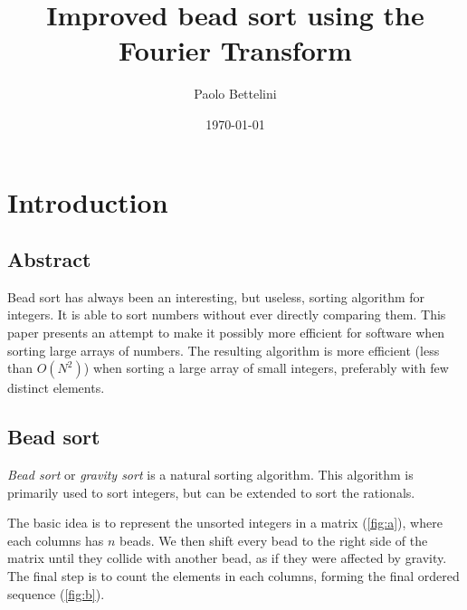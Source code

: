 \documentclass{article}
\title{Improved bead sort using the Fourier Transform}
\author{Paolo Bettelini}
\date{\today}
\begin{document}
\thispagestyle{plain}

\maketitle

\section{Introduction}

\subsection{Abstract}

Bead sort has always been an interesting, but useless, sorting algorithm
for integers. It is able to sort numbers without ever directly comparing them.
This paper presents an attempt to make it possibly more efficient
for software when sorting large arrays of numbers.
The resulting algorithm is more efficient (less than \(O(N^2)\)) when sorting a large array of small integers,
preferably with few distinct elements.

\subsection{Bead sort}

\textit{Bead sort}\cite{beadsort} or \textit{gravity sort}
is a natural sorting algorithm.
This algorithm is primarily used to sort
integers, but can be extended to sort the rationals.

The basic idea is to represent the unsorted integers
in a matrix (\ref{fig:a}), where each columns has \(n\) beads.
We then shift every bead to the right side of the matrix
until they collide with another bead,
as if they were affected by gravity.
The final step is to count the elements in each columns,
forming the final ordered sequence (\ref{fig:b}).
\end{document}

